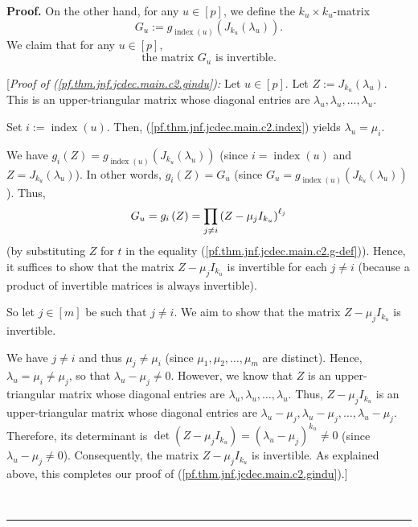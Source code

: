 \documentclass[numbers=enddot,12pt,final,onecolumn,notitlepage]{scrartcl}%
\numberwithin{exer}{subsection}
\theoremstyle{definition}
\newenvironment{proof}[1][Proof]{\noindent\textbf{#1.} }{\ \rule{0.5em}{0.5em}}
\let\prodnonlimits\prod
\renewcommand{\prod}{\prodnonlimits\limits}
\newenvironment{noncompile}{}{}
\begin{document}
\begin{proof}
\begin{noncompile}
On the other hand, for any $u\in\left[  p\right]  $, we define the
$k_{u}\times k_{u}$-matrix%
\begin{equation}
G_{u}:=g_{\operatorname*{index}\left(  u\right)  }\left(  J_{k_{u}}\left(
\lambda_{u}\right)  \right)  . \label{pf.thm.jnf.jcdec.main.c2.Gu}%
\end{equation}
We claim that for any $u\in\left[  p\right]  $,
\begin{equation}
\text{the matrix }G_{u}\text{ is invertible.}
\label{pf.thm.jnf.jcdec.main.c2.gindu}%
\end{equation}


[\textit{Proof of (\ref{pf.thm.jnf.jcdec.main.c2.gindu}):} Let $u\in\left[
p\right]  $. Let $Z:=J_{k_{u}}\left(  \lambda_{u}\right)  $. This is an
upper-triangular matrix whose diagonal entries are $\lambda_{u},\lambda
_{u},\ldots,\lambda_{u}$.

Set $i:=\operatorname*{index}\left(  u\right)  $. Then,
(\ref{pf.thm.jnf.jcdec.main.c2.index}) yields $\lambda_{u}=\mu_{i}$.

We have $g_{i}\left(  Z\right)  =g_{\operatorname*{index}\left(  u\right)
}\left(  J_{k_{u}}\left(  \lambda_{u}\right)  \right)  $ (since
$i=\operatorname*{index}\left(  u\right)  $ and $Z=J_{k_{u}}\left(
\lambda_{u}\right)  $). In other words, $g_{i}\left(  Z\right)  =G_{u}$ (since
$G_{u}=g_{\operatorname*{index}\left(  u\right)  }\left(  J_{k_{u}}\left(
\lambda_{u}\right)  \right)  $). Thus,%
\[
G_{u}=g_{i}\left(  Z\right)  =\prod\limits_{j\neq i}\left(  Z-\mu_{j}I_{k_{u}%
}\right)  ^{\ell_{j}}%
\]
(by substituting $Z$ for $t$ in the equality
(\ref{pf.thm.jnf.jcdec.main.c2.g-def})). Hence, it suffices to show that the
matrix $Z-\mu_{j}I_{k_{u}}$ is invertible for each $j\neq i$ (because a
product of invertible matrices is always invertible).

So let $j\in\left[  m\right]  $ be such that $j\neq i$. We aim to show that
the matrix $Z-\mu_{j}I_{k_{u}}$ is invertible.

We have $j\neq i$ and thus $\mu_{j}\neq\mu_{i}$ (since $\mu_{1},\mu_{2}%
,\ldots,\mu_{m}$ are distinct). Hence, $\lambda_{u}=\mu_{i}\neq\mu_{j}$, so
that $\lambda_{u}-\mu_{j}\neq0$. However, we know that $Z$ is an
upper-triangular matrix whose diagonal entries are $\lambda_{u},\lambda
_{u},\ldots,\lambda_{u}$. Thus, $Z-\mu_{j}I_{k_{u}}$ is an upper-triangular
matrix whose diagonal entries are $\lambda_{u}-\mu_{j},\lambda_{u}-\mu
_{j},\ldots,\lambda_{u}-\mu_{j}$. Therefore, its determinant is $\det\left(
Z-\mu_{j}I_{k_{u}}\right)  =\left(  \lambda_{u}-\mu_{j}\right)  ^{k_{u}}\neq0$
(since $\lambda_{u}-\mu_{j}\neq0$). Consequently, the matrix $Z-\mu
_{j}I_{k_{u}}$ is invertible. As explained above, this completes our proof of
(\ref{pf.thm.jnf.jcdec.main.c2.gindu}).] \medskip


\end{noncompile}
\end{proof}
\end{document}
